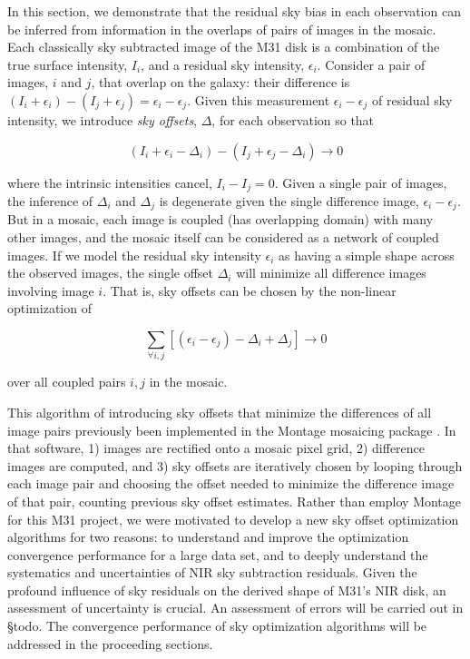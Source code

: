 \documentclass[iop]{emulateapj}
\newcommand{\todo}[1]{\textcolor{RedOrange}{#1}} %
\begin{document}
In this section, we demonstrate that the residual sky bias in each observation can be inferred from information in the overlaps of pairs of images in the mosaic. Each classically sky subtracted image of the M31 disk is a combination of the true surface intensity, $I_i$, and a residual sky intensity, $\epsilon_i$. Consider a pair of images, $i$ and $j$, that overlap on the galaxy: their difference is $(I_i+\epsilon_i) - (I_j+\epsilon_j) = \epsilon_i - \epsilon_j$. Given this measurement $\epsilon_i - \epsilon_j$ of residual sky intensity, we introduce \emph{sky offsets}, $\Delta$, for each observation so that

\begin{equation}
    (I_i + \epsilon_i - \Delta_i) - (I_j + \epsilon_j - \Delta_i) \rightarrow 0
\end{equation}

\noindent where the intrinsic intensities cancel, $I_i - I_j = 0$. Given a single pair of images, the inference of $\Delta_i$ and $\Delta_j$ is degenerate given the single difference image, $\epsilon_i-\epsilon_j$. But in a mosaic, each image is coupled (has overlapping domain) with many other images, and the mosaic itself can be considered as a network of coupled images. If we model the residual sky intensity $\epsilon_i$ as having a simple shape across the observed images, the single offset $\Delta_i$ will minimize all difference images involving image $i$. That is, sky offsets can be chosen by the non-linear optimization of

\begin{equation}
    \sum_{\forall i,j} [(\epsilon_i - \epsilon_j) - \Delta_i + \Delta_j] \rightarrow 0
    \label{eq:scalartheoryobj}
\end{equation}

\noindent over all coupled pairs $i,j$ in the mosaic.

This algorithm of introducing sky offsets that minimize the differences of all image pairs previously been implemented in the Montage mosaicing package \citep{Berriman:2008}. In that software, 1) images are rectified onto a mosaic pixel grid, 2) difference images are computed, and 3) sky offsets are iteratively chosen by looping through each image pair and choosing the offset needed to minimize the difference image of that pair, counting previous sky offset estimates. Rather than employ Montage for this M31 project, we were motivated to develop a new sky offset optimization algorithms for two reasons: to understand and improve the optimization convergence performance for a large data set, and to deeply understand the systematics and uncertainties of NIR sky subtraction residuals. Given the profound influence of sky residuals on the derived shape of M31's NIR disk, an assessment of uncertainty is crucial. An assessment of errors will be carried out in \todo{\S todo}. The convergence performance of sky optimization algorithms will be addressed in the proceeding sections.
\end{document}
